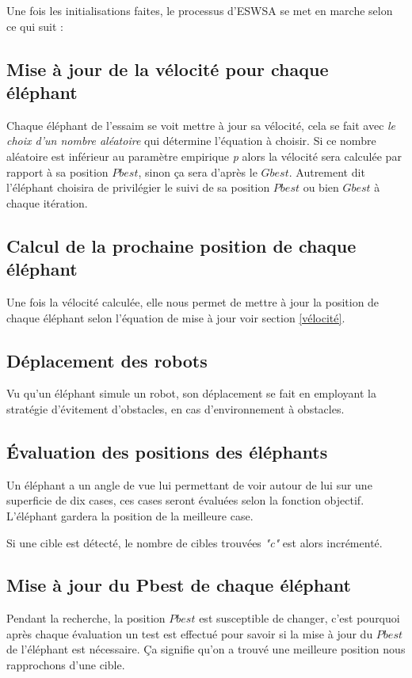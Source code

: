 Une fois les initialisations faites, le processus d'ESWSA se met en marche selon ce qui suit :

\subsection{Mise à jour de la vélocité pour chaque éléphant}
Chaque éléphant de l'essaim se voit mettre à jour sa vélocité, cela se fait avec \textit{le choix d'un nombre aléatoire} qui détermine l'équation à choisir. Si ce nombre aléatoire est inférieur au paramètre empirique \textit{p} alors la vélocité sera calculée par rapport à sa position $Pbest$, sinon ça sera d'après le $Gbest$. Autrement dit l'éléphant choisira de privilégier le suivi de sa position $Pbest$ ou bien $Gbest$ à chaque itération.

\subsection{Calcul de la prochaine position de chaque éléphant}
Une fois la vélocité calculée, elle nous permet de mettre à jour la position de chaque éléphant selon l'équation de mise à jour voir section \ref{vélocité}.

\subsection{Déplacement des robots}
Vu qu'un éléphant simule un robot, son déplacement se fait en employant la stratégie d'évitement d'obstacles, en cas d'environnement à obstacles.

\subsection{Évaluation des positions des éléphants}
Un éléphant a un angle de vue lui permettant de voir autour de lui sur une superficie de dix cases, ces cases seront évaluées selon la fonction objectif. L'éléphant gardera la position de la meilleure case.

Si une cible est détecté, le nombre de cibles trouvées \textit{"c"} est alors incrémenté.

\subsection{Mise à jour du Pbest de chaque éléphant}
Pendant la recherche, la position $Pbest$ est susceptible de changer, c'est pourquoi après chaque évaluation un test est effectué pour savoir si la mise à jour du $Pbest$ de l'éléphant est nécessaire. Ça signifie qu'on a trouvé une meilleure position nous rapprochons d'une cible.

